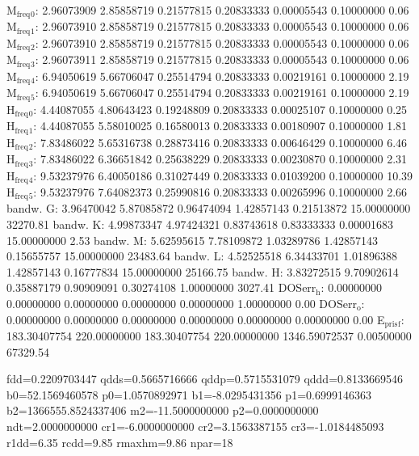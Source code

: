 \documentclass[11pt]{article}
\begin{document}
M\(_{\text{freq}}\)\(_{\text{0}}\):   2.96073909   2.85858719   0.21577815   0.20833333   0.00005543   0.10000000         0.06
M\(_{\text{freq}}\)\(_{\text{1}}\):   2.96073910   2.85858719   0.21577815   0.20833333   0.00005543   0.10000000         0.06
M\(_{\text{freq}}\)\(_{\text{2}}\):   2.96073910   2.85858719   0.21577815   0.20833333   0.00005543   0.10000000         0.06
M\(_{\text{freq}}\)\(_{\text{3}}\):   2.96073911   2.85858719   0.21577815   0.20833333   0.00005543   0.10000000         0.06
M\(_{\text{freq}}\)\(_{\text{4}}\):   6.94050619   5.66706047   0.25514794   0.20833333   0.00219161   0.10000000         2.19
M\(_{\text{freq}}\)\(_{\text{5}}\):   6.94050619   5.66706047   0.25514794   0.20833333   0.00219161   0.10000000         2.19
H\(_{\text{freq}}\)\(_{\text{0}}\):   4.44087055   4.80643423   0.19248809   0.20833333   0.00025107   0.10000000         0.25
H\(_{\text{freq}}\)\(_{\text{1}}\):   4.44087055   5.58010025   0.16580013   0.20833333   0.00180907   0.10000000         1.81
H\(_{\text{freq}}\)\(_{\text{2}}\):   7.83486022   5.65316738   0.28873416   0.20833333   0.00646429   0.10000000         6.46
H\(_{\text{freq}}\)\(_{\text{3}}\):   7.83486022   6.36651842   0.25638229   0.20833333   0.00230870   0.10000000         2.31
H\(_{\text{freq}}\)\(_{\text{4}}\):   9.53237976   6.40050186   0.31027449   0.20833333   0.01039200   0.10000000        10.39
H\(_{\text{freq}}\)\(_{\text{5}}\):   9.53237976   7.64082373   0.25990816   0.20833333   0.00265996   0.10000000         2.66
bandw. G:   3.96470042   5.87085872   0.96474094   1.42857143   0.21513872  15.00000000     32270.81
bandw. K:   4.99873347   4.97424321   0.83743618   0.83333333   0.00001683  15.00000000         2.53
bandw. M:   5.62595615   7.78109872   1.03289786   1.42857143   0.15655757  15.00000000     23483.64
bandw. L:   4.52525518   6.34433701   1.01896388   1.42857143   0.16777834  15.00000000     25166.75
bandw. H:   3.83272515   9.70902614   0.35887179   0.90909091   0.30274108   1.00000000      3027.41
DOSerr\(_{\text{h}}\):   0.00000000   0.00000000   0.00000000   0.00000000   0.00000000   1.00000000         0.00
DOSerr\(_{\text{o}}\):   0.00000000   0.00000000   0.00000000   0.00000000   0.00000000   0.00000000         0.00
E\(_{\text{pris}}\)\(_{\text{f}}\): 183.30407754 220.00000000 183.30407754 220.00000000 1346.59072537   0.00500000     67329.54

fdd=0.2209703447 qdds=0.5665716666 qddp=0.5715531079 qddd=0.8133669546 b0=52.1569460578 p0=1.0570892971 b1=-8.0295431356 p1=0.6999146363 b2=1366555.8524337406 m2=-11.5000000000 p2=0.0000000000 ndt=2.0000000000 cr1=-6.0000000000 cr2=3.1563387155 cr3=-1.0184485093 r1dd=6.35 rcdd=9.85 rmaxhm=9.86 npar=18
\end{document}
